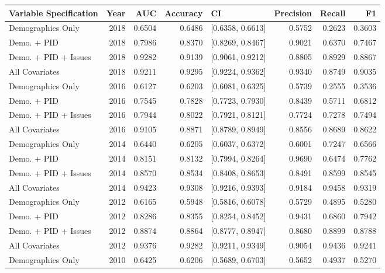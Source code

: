 \begin{table}[H]
\centering
\begin{tabular}{lrrrlrrr}
  \toprule
Variable Specification & Year & AUC & Accuracy & CI & Precision & Recall & F1 \\ 
  \midrule
Demographics Only & 2018 & 0.6504 & 0.6486 & [0.6358, 0.6613] & 0.5752 & 0.2623 & 0.3603 \\ 
  Demo. + PID & 2018 & 0.7986 & 0.8370 & [0.8269, 0.8467] & 0.9021 & 0.6370 & 0.7467 \\ 
  Demo. + PID + Issues & 2018 & 0.9282 & 0.9139 & [0.9061, 0.9212] & 0.8805 & 0.8929 & 0.8867 \\ 
  All Covariates & 2018 & 0.9211 & 0.9295 & [0.9224, 0.9362] & 0.9340 & 0.8749 & 0.9035 \\ 
  Demographics Only & 2016 & 0.6127 & 0.6203 & [0.6081, 0.6325] & 0.5739 & 0.2555 & 0.3536 \\ 
  Demo. + PID & 2016 & 0.7545 & 0.7828 & [0.7723, 0.7930] & 0.8439 & 0.5711 & 0.6812 \\ 
  Demo. + PID + Issues & 2016 & 0.7944 & 0.8022 & [0.7921, 0.8121] & 0.7724 & 0.7278 & 0.7494 \\ 
  All Covariates & 2016 & 0.9105 & 0.8871 & [0.8789, 0.8949] & 0.8556 & 0.8689 & 0.8622 \\ 
  Demographics Only & 2014 & 0.6440 & 0.6205 & [0.6037, 0.6372] & 0.6001 & 0.7247 & 0.6566 \\ 
  Demo. + PID & 2014 & 0.8151 & 0.8132 & [0.7994, 0.8264] & 0.9690 & 0.6474 & 0.7762 \\ 
  Demo. + PID + Issues & 2014 & 0.8570 & 0.8534 & [0.8408, 0.8653] & 0.8491 & 0.8599 & 0.8545 \\ 
  All Covariates & 2014 & 0.9423 & 0.9308 & [0.9216, 0.9393] & 0.9184 & 0.9458 & 0.9319 \\ 
  Demographics Only & 2012 & 0.6165 & 0.5948 & [0.5816, 0.6078] & 0.5729 & 0.4895 & 0.5280 \\ 
  Demo. + PID & 2012 & 0.8286 & 0.8355 & [0.8254, 0.8452] & 0.9431 & 0.6860 & 0.7942 \\ 
  Demo. + PID + Issues & 2012 & 0.8874 & 0.8864 & [0.8777, 0.8947] & 0.8680 & 0.8899 & 0.8788 \\ 
  All Covariates & 2012 & 0.9376 & 0.9282 & [0.9211, 0.9349] & 0.9054 & 0.9436 & 0.9241 \\ 
  Demographics Only & 2010 & 0.6425 & 0.6206 & [0.5689, 0.6703] & 0.5652 & 0.4937 & 0.5270 \\ 

\end{tabular}
\end{table}
